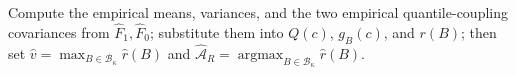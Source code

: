 Compute the empirical means, variances, and the two empirical quantile-coupling covariances from \(\widehat F_1,\widehat F_0\); substitute them into \(Q(c)\), \(g_B(c)\), and \(r(B)\); then set \(\widehat v=\max_{B\in\mathcal B_\kappa}\widehat r(B)\) and \(\widehat{\mathcal A}_R=\operatorname*{argmax}_{B\in\mathcal B_\kappa}\widehat r(B)\).